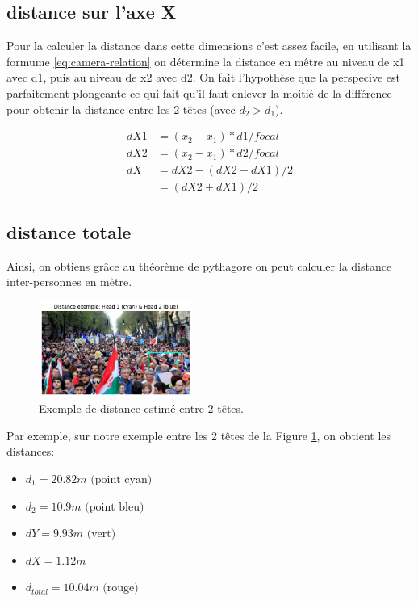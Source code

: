 \subsection{distance sur l'axe X}

Pour la calculer la distance dans cette dimensions c'est assez facile, en utilisant la formume \ref{eq:camera-relation} on détermine la distance en mêtre au niveau de x1 avec d1, puis au niveau de x2 avec d2.
On fait l'hypothèse que la perspecive est parfaitement plongeante ce qui fait qu'il faut enlever la moitié de la différence pour obtenir la distance entre les 2 têtes (avec $d_2>d_1$).

\begin{align}
    dX1 &= (x_2-x_1) * d1 / focal \\
    dX2 &= (x_2-x_1) * d2 / focal \\
    dX  &= dX2 - (dX2-dX1)/2 \\
        &= (dX2 + dX1) /2
\end{align}

\subsection{distance totale}

Ainsi, on obtiens grâce au théorème de pythagore on peut calculer la distance inter-personnes en mètre.

\begin{figure}[h!]
    \centering
    \includegraphics[width=0.45\textwidth]{images/exemple_dist_estimation.png}
    \caption{Exemple de distance estimé entre 2 têtes.}
    \label{fig:distance-estimation}
\end{figure}

Par exemple, sur notre exemple entre les 2 têtes de la Figure \ref{fig:distance-estimation}, on obtient les distances:

\begin{itemize}
    \item $d_1  = 20.82 m \text{ (point cyan)}$
    \item $d_2  = 10.9 m \text{ (point bleu)}$
    \item $dY  = 9.93 m \text{ (vert)}$
    \item $dX  = 1.12 m$
    \item $d_{total} = 10.04m \text{ (rouge)}$
\end{itemize}

